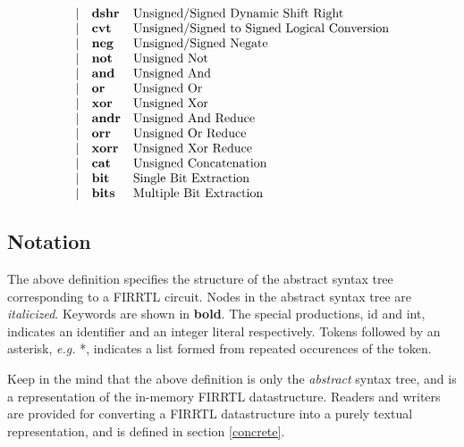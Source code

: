 \documentclass[10pt]{article}
\begin{document}
\[\begin{array}{rll}
\vert           &\text{\bf dshr}           &\text{Unsigned/Signed Dynamic Shift Right}\\
\vert           &\text{\bf cvt}            &\text{Unsigned/Signed to Signed Logical Conversion}\\
\vert           &\text{\bf neg}            &\text{Unsigned/Signed Negate}\\
\vert           &\text{\bf not}            &\text{Unsigned Not}\\
\vert           &\text{\bf and}            &\text{Unsigned And}\\
\vert           &\text{\bf or}             &\text{Unsigned Or}\\
\vert           &\text{\bf xor}            &\text{Unsigned Xor}\\
\vert           &\text{\bf andr}           &\text{Unsigned And Reduce}\\
\vert           &\text{\bf orr}            &\text{Unsigned Or Reduce}\\
\vert           &\text{\bf xorr}           &\text{Unsigned Xor Reduce}\\
\vert           &\text{\bf cat}            &\text{Unsigned Concatenation}\\
\vert           &\text{\bf bit}            &\text{Single Bit Extraction}\\
\vert           &\text{\bf bits}           &\text{Multiple Bit Extraction}\\
\end{array}
\]

\subsection{Notation}
The above definition specifies the structure of the abstract syntax tree corresponding to a FIRRTL circuit.
Nodes in the abstract syntax tree are {\em italicized}.
Keywords are shown in {\bf bold}.
The special productions, id and int, indicates an identifier and an integer literal respectively.
Tokens followed by an asterisk, {\em e.g.} *, indicates a list formed from repeated occurences of the token.

Keep in the mind that the above definition is only the {\em abstract} syntax tree, and is a representation of the in-memory FIRRTL datastructure.
Readers and writers are provided for converting a FIRRTL datastructure into a purely textual representation, and is defined in section \ref{concrete}.
\end{document}
